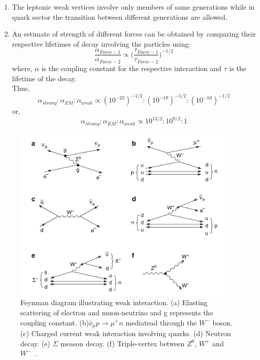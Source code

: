 \begin{enumerate}
	\item The leptonic weak vertices involve only members of same generations while in quark sector the transition between different generations are allowed.
	\item An estimate of strength of different forces can be obtained by comparing their respective lifetimes of decay involving the particles using: \begin{equation}
		\frac{\alpha_{Force-1}}{\alpha_{Force-2}} \propto \Big(\frac{\tau_{Force-1}}{\tau_{Force-2}}\Big)^{-1/2}
	\end{equation}
	where, $\alpha$ is the coupling constant for the respective interaction and $\tau$ is the lifetime of the decay.\\
	Thus,\begin{equation}
		\alpha_{strong}:\alpha_{EM}:\alpha_{weak} \propto (10^{-23})^{-1/2}:(10^{-19})^{-1/2}:(10^{-10})^{-1/2}
	\end{equation}or,
	\begin{equation}
		\alpha_{strong}:\alpha_{EM}:\alpha_{weak} \propto 10^{13/2}: 10^{9/2}: 1
	\end{equation}
\end{enumerate}



\begin{figure}[htbp]
	\centering
	\includegraphics[width=0.95\textwidth]{figures/Intro/weak_interaction_Fey.png}
	\caption{Feynman diagram illustrating weak interaction. (a) Elasting scattering of electron and muon-neutrino and g represents the coupling constant. (b)$\bar{\nu}_{\mu} p \rightarrow \mu^+ n$ mediatead through the $W^-$ boson. (c) Charged current weak interaction involving quarks. (d) Neutron decay. (e) $\Sigma$ meason decay. (f) Triple-vertex between $Z^0$, $W^+$ and $W^-$~\cite{Braibant2012}.}
	\label{fig:weak_int}
\end{figure}

